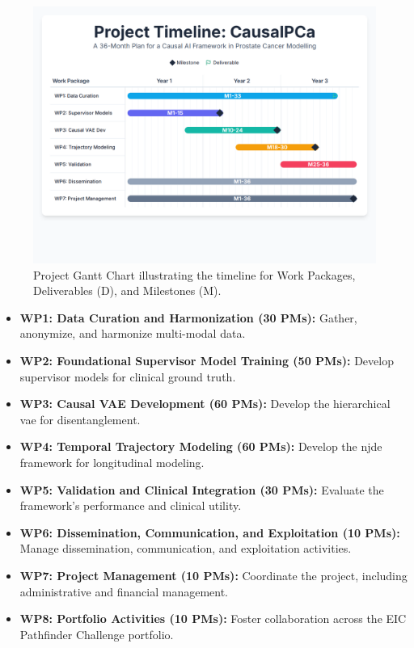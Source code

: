 \documentclass[11pt, a4paper]{article}
\begin{document}
\begin{figure}[H]
    \centering
    \includegraphics[width=\textwidth]{gantt.png}
    \caption{Project Gantt Chart illustrating the timeline for Work Packages, Deliverables (D), and Milestones (M).}
    \label{fig:gantt}
\end{figure}

\begin{itemize}
    \item \textbf{WP1: Data Curation and Harmonization (30 PMs):} Gather, anonymize, and harmonize multi-modal data.
    \item \textbf{WP2: Foundational Supervisor Model Training (50 PMs):} Develop supervisor models for clinical ground truth.
    \item \textbf{WP3: Causal VAE Development (60 PMs):} Develop the hierarchical \gls{vae} for disentanglement.
    \item \textbf{WP4: Temporal Trajectory Modeling (60 PMs):} Develop the \gls{njde} framework for longitudinal modeling.
    \item \textbf{WP5: Validation and Clinical Integration (30 PMs):} Evaluate the framework's performance and clinical utility.
    \item \textbf{WP6: Dissemination, Communication, and Exploitation (10 PMs):} Manage dissemination, communication, and exploitation activities.
    \item \textbf{WP7: Project Management (10 PMs):} Coordinate the project, including administrative and financial management.
    \item \textbf{WP8: Portfolio Activities (10 PMs):} Foster collaboration across the EIC Pathfinder Challenge portfolio.
\end{itemize}
\end{document}
